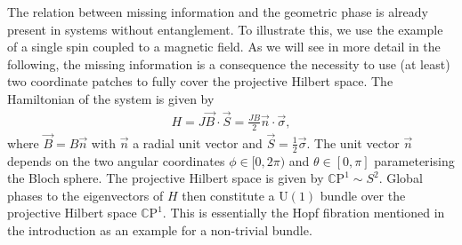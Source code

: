 \documentclass[a4paper,11pt]{article}
\newcommand{\CP}[1]{\mathds{C}\text{P}^{#1}}
\newcommand{\U}{\text{U}}
\newcommand{\1}{\mathds{1}}
\begin{document}
The relation between missing information and the geometric phase is already present in systems without entanglement. To illustrate this, we use the example of a single spin coupled to a magnetic field. As we will see in more detail in the following, the missing information is a consequence the necessity to use (at least) two coordinate patches to fully cover the projective Hilbert space. The Hamiltonian of the system is given by
\begin{align}
    H=J\vec{B}\cdot\vec{S}=\frac{JB}{2}\vec{n}\cdot\vec{\sigma},
\end{align}
where $\vec{B}=B\vec{n}$ with $\vec{n}$ a radial unit vector and $\vec{S}=\frac{1}{2}\vec{\sigma}$. The unit vector $\vec{n}$ depends on the two angular coordinates $\phi\in[0,2\pi)$ and $\theta\in[0,\pi]$ parameterising the Bloch sphere. The projective Hilbert space is given by $\CP{1}\sim S^2$. Global phases to the eigenvectors of $H$ then constitute a $\U(1)$ bundle over the projective Hilbert space $\CP{1}$. This is essentially the Hopf fibration \cite{hopf1964abbildungen} mentioned in the introduction as an example for a non-trivial bundle.
\end{document}
